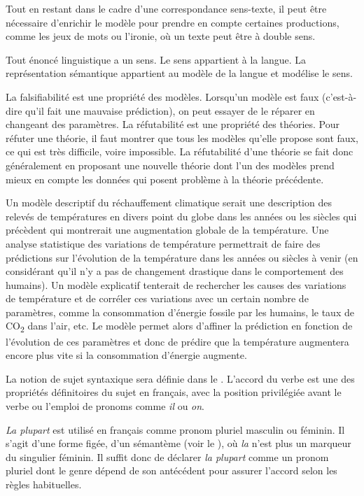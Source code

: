 {Tout en restant dans le cadre d’une correspondance sens-texte, il peut être nécessaire d’enrichir le modèle pour prendre en compte certaines productions, comme les jeux de mots ou l’ironie, où un texte peut être à double sens.

    
     Tout énoncé linguistique a un sens. Le sens appartient à la langue. La représentation sémantique appartient au modèle de la langue et modélise le sens.

     La falsifiabilité est une propriété des modèles. Lorsqu’un modèle est faux (c’est-à-dire qu’il fait une mauvaise prédiction), on peut essayer de le réparer en changeant des paramètres. La réfutabilité est une propriété des théories. Pour réfuter une théorie, il faut montrer que tous les modèles qu’elle propose sont faux, ce qui est très difficile, voire impossible. La réfutabilité d’une théorie se fait donc généralement en proposant une nouvelle théorie dont l’un des modèles prend mieux en compte les données qui posent problème à la théorie précédente.

     Un modèle descriptif du réchauffement climatique serait une description des relevés de températures en divers point du globe dans les années ou les siècles qui précèdent qui montrerait une augmentation globale de la température. Une analyse statistique des variations de température permettrait de faire des prédictions sur l’évolution de la température dans les années ou siècles à venir (en considérant qu'il n'y a pas de changement drastique dans le comportement des humains). Un modèle explicatif tenterait de rechercher les causes des variations de température et de corréler ces variations avec un certain nombre de paramètres, comme la consommation d’énergie fossile par les humains, le taux de CO\textsubscript{2} dans l'air, etc. Le modèle permet alors d’affiner la prédiction en fonction de l’évolution de ces paramètres et donc de prédire que la température augmentera encore plus vite si la consommation d’énergie augmente.

     La notion de sujet syntaxique sera définie dans le . L’accord du verbe est une des propriétés définitoires du sujet en français, avec la position privilégiée avant le verbe ou l’emploi de pronoms comme \textit{il} ou \textit{on}.

     \textit{La plupart} est utilisé en français comme pronom pluriel masculin ou féminin. Il s’agit d’une forme figée, d’un sémantème (voir le ), où \textit{la} n’est plus un marqueur du singulier féminin. Il suffit donc de déclarer \textit{la plupart} comme un pronom pluriel dont le genre dépend de son antécédent pour assurer l’accord selon les règles habituelles.

}
